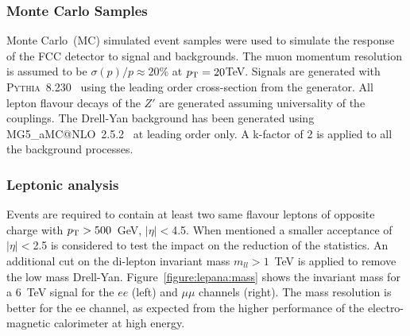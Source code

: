 \subsubsection{Monte Carlo Samples}
\label{subsection:MC}
Monte Carlo~(MC) simulated event samples were used to simulate the response of the FCC detector to signal and backgrounds. The muon momentum resolution 
is assumed to be $\sigma(p)/p \approx 20\%$ at $p_{\text{T}}= 20 $TeV. Signals are generated with {\scshape Pythia}~8.230~\cite{Sjostrand:2014zea} using the leading 
order cross-section from the generator. All lepton flavour decays of the $Z'$ are generated assuming universality of the couplings.
The Drell-Yan background has been generated using {\scshape MG5\_}a{\scshape MC@NLO}~2.5.2~\cite{Alwall:2014hca} at leading order only. 
A k-factor of 2 is applied to all the background processes.



\subsubsection{Leptonic analysis}
\label{subsection:lepana}

Events are required to contain at least two same flavour leptons of opposite charge with $p_{\text{T}} > 500$~GeV, $|\eta|<$4.5. 
When mentioned a smaller acceptance of $|\eta|<$2.5 is considered to test the impact on the reduction of the statistics. 
An additional cut on the di-lepton invariant mass $m_{ll}>1$~TeV is applied to remove the low mass Drell-Yan. 
Figure~\ref{figure:lepana:mass} shows the invariant mass for a 6~TeV signal for the $ee$ (left) and $\mu\mu$ channels (right). 
The mass resolution is better for the ee channel, as expected from the higher performance of the electro-magnetic calorimeter at high energy.

